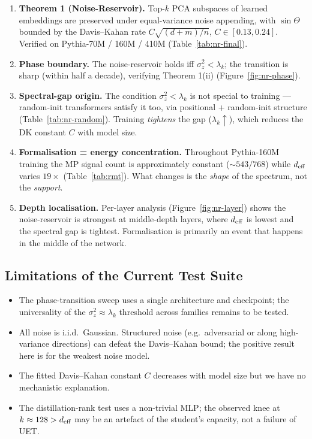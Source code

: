 \begin{enumerate}[leftmargin=1.8em,itemsep=2pt]
  \item \textbf{Theorem 1 (Noise-Reservoir).}
    Top-$k$ PCA subspaces of learned embeddings are preserved under
    equal-variance noise appending, with $\sin\Theta$ bounded by the
    Davis--Kahan rate $C \sqrt{(d+m)/n}$, $C \in [0.13, 0.24]$.
    Verified on Pythia-70M / 160M / 410M (Table~\ref{tab:nr-final}).
  \item \textbf{Phase boundary.}
    The noise-reservoir holds iff $\sigma_z^2 < \lambda_k$; the transition
    is sharp (within half a decade), verifying Theorem 1(ii)
    (Figure~\ref{fig:nr-phase}).
  \item \textbf{Spectral-gap origin.}
    The condition $\sigma_z^2 < \lambda_k$ is not special to training ---
    random-init transformers satisfy it too, via positional + random-init
    structure (Table~\ref{tab:nr-random}).
    Training \emph{tightens} the gap ($\lambda_k \uparrow$), which reduces
    the DK constant $C$ with model size.
  \item \textbf{Formalisation = energy concentration.}
    Throughout Pythia-160M training the MP signal count is approximately
    constant ($\sim 543 / 768$) while $d_{\mathrm{eff}}$ varies $19\times$
    (Table~\ref{tab:rmt}).
    What changes is the \emph{shape} of the spectrum, not the \emph{support}.
  \item \textbf{Depth localisation.}
    Per-layer analysis (Figure~\ref{fig:nr-layer}) shows the noise-reservoir
    is strongest at middle-depth layers, where $d_{\mathrm{eff}}$ is lowest and the
    spectral gap is tightest.
    Formalisation is primarily an event that happens in the middle of the
    network.
\end{enumerate}

\subsection{Limitations of the Current Test Suite}

\begin{itemize}[leftmargin=1.7em,itemsep=1pt]
  \item The phase-transition sweep uses a single architecture and
        checkpoint; the universality of the $\sigma_z^2 \approx \lambda_k$
        threshold across families remains to be tested.
  \item All noise is i.i.d.\ Gaussian. Structured noise (e.g.\ adversarial
        or along high-variance directions) can defeat the Davis--Kahan
        bound; the positive result here is for the weakest noise model.
  \item The fitted Davis--Kahan constant $C$ decreases with model size
        but we have no mechanistic explanation.
  \item The distillation-rank test uses a non-trivial MLP; the observed
        knee at $k \approx 128 > d_{\mathrm{eff}}$ may be an artefact of the student's
        capacity, not a failure of UET.
\end{itemize}
